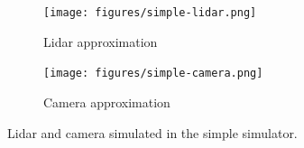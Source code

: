 \begin{figure}
    \centering

    \begin{subfigure}[b]{0.45\textwidth}
        \centering
        \texttt{[image: figures/simple-lidar.png]}
        \caption{Lidar approximation}
        \label{fig:lidar-approximation}
    \end{subfigure}
    \begin{subfigure}[b]{0.45\textwidth}
        \centering
        \texttt{[image: figures/simple-camera.png]}
        \caption{Camera approximation}
        \label{fig:camera-approximation}
    \end{subfigure}

    \caption{Lidar and camera simulated in the simple simulator.}\label{fig:sensor-approximation}
\end{figure}



